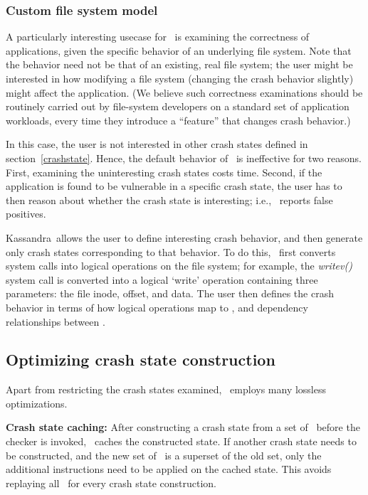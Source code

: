 \subsubsection{Custom file system model}

A particularly interesting usecase for \Kassandra\ is examining the correctness of applications, given the specific behavior of an underlying file system. Note that the behavior need not be that of an existing, real file system; the user might be interested in how modifying a file system (changing the crash behavior slightly) might affect the application. (We believe such correctness examinations should be routinely carried out by file-system developers on a standard set of application workloads, every time they introduce a ``feature'' that changes crash behavior.)

In this case, the user is not interested in other crash states defined in section~\ref{crashstate}. Hence, the default behavior of \Kassandra\ is ineffective for two reasons. First, examining the uninteresting crash states costs time. Second, if the application is found to be vulnerable in a specific crash state, the user has to then reason about whether the crash state is interesting; i.e., \Kassandra\ reports false positives.

Kassandra\ allows the user to define interesting crash behavior, and then generate only crash states corresponding to that behavior. To do this, \Kassandra\ first converts system calls into logical operations on the file system; for example, the {\it writev()} system call is converted into a logical `write' operation containing three parameters: the file inode, offset, and data. The user then defines the crash behavior in terms of how logical operations map to \microinstructions, and dependency relationships between \microinstructions. 

\subsection{Optimizing crash state construction}
\label{optimizations}
Apart from restricting the crash states examined, \Kassandra\ employs many lossless optimizations.

\noindent\textbf{Crash state caching:} After constructing a crash state from a set of \microinstructions\, before the checker is invoked, \Kassandra\ caches the constructed state. If another crash state needs to be constructed, and the new set of \microinstructions\ is a superset of the old set, only the additional instructions need to be applied on the cached state. This avoids replaying all \microinstructions\ for every crash state construction.

